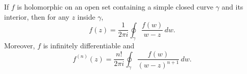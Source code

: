 If $f$ is holomorphic on an open set containing a simple closed curve $\gamma$ and its interior, then for any $z$ inside $\gamma$,
$$f(z) = \frac{1}{2\pi i} \oint_\gamma \frac{f(w)}{w - z} \, dw.$$
Moreover, $f$ is infinitely differentiable and
$$f^{(n)}(z) = \frac{n!}{2\pi i} \oint_\gamma \frac{f(w)}{(w - z)^{n+1}} \, dw.$$
